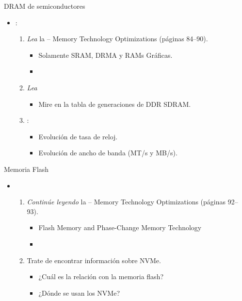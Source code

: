 \begin{frame}[t]{DRAM de semiconductores}
  \begin{itemize}
    \item {}:
      \begin{enumerate}
        \item \emph{Lea} la  -- 
              Memory Technology Optimizations (páginas 84--90).
          \begin{itemize}
            \item Solamente SRAM, DRMA y RAMs Gráficas.
            \item \bibhennessy
          \end{itemize}

        \item \emph{Lea} 
          \begin{itemize}
            \item Mire en la tabla de generaciones de DDR SDRAM.
          \end{itemize}

        \item {}:
          \begin{itemize}
            \item Evolución de tasa de reloj.
            \item Evolución de ancho de banda (MT/s y MB/s).
          \end{itemize}
      \end{enumerate}
  \end{itemize}
\end{frame}

\begin{frame}[t]{Memoria Flash}
  \begin{itemize}
    \item {}
      \begin{enumerate}
        \item \emph{Continúe leyendo} la  -- 
              Memory Technology Optimizations (páginas 92--93).
          \begin{itemize}
            \item Flash Memory and Phase-Change Memory Technology
            \item \bibhennessy
          \end{itemize}

        \item Trate de encontrar información sobre NVMe.
          \begin{itemize}
            \item ¿Cuál es la relación con la memoria flash?
            \item ¿Dónde se usan los NVMe?
          \end{itemize}
      \end{enumerate}
  \end{itemize}
\end{frame}

